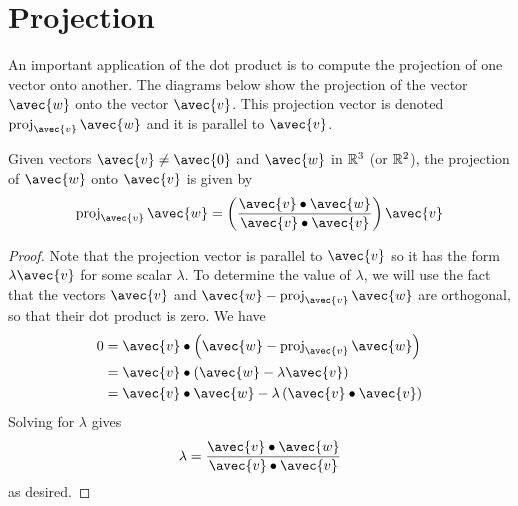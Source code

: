 \documentclass[handout]{ximera}
\begin{document}
\section{Projection}

An important application of the dot product is to compute the projection of one vector onto another.
The diagrams below show the projection of the vector $\avec{w}$ onto the vector $\avec{v}$. This projection vector is denoted $\proj_{\avec{v}} \avec{w}$
and it is parallel to $\avec{v}$.

\begin{image}
\end{image}

\begin{proposition}
Given vectors $\avec{v} \neq \avec{0}$ and $\avec{w}$ in $\mathbb R^3$ (or $\mathbb R^2$), the projection of $\avec{w}$ onto $\avec{v}$ is given by
\[
\proj_{\avec{v}} \avec{w} = \left(\frac{\avec{v} \dotp \avec{w}}{\avec{v} \dotp \avec{v}}\right) \avec{v}
\]


\begin{proof}
Note that the projection vector is parallel to $\avec{v}$ so it has the form $\lambda \avec{v}$ for some scalar $\lambda$.
To determine the value of $\lambda$, we will use the fact that the vectors $\avec{v}$ and $\avec{w} - \proj_{\avec{v}} \avec{w}$ are orthogonal, 
so that their dot product is zero. We have
\begin{align*}
0 &= \avec{v} \dotp \left(\avec{w} - \proj_{\avec{v}} \avec{w} \right)\\
  &= \avec{v} \dotp \left(\avec{w} - \lambda \avec{v}\right)\\
  &= \avec{v} \dotp \avec{w} - \lambda \left( \avec{v} \dotp \avec{v} \right)
\end{align*}
Solving for $\lambda$ gives
\[
\lambda = \frac{\avec{v} \dotp \avec{w}}{\avec{v} \dotp \avec{v}}
\]
as desired.
\end{proof}
\end{proposition}
\end{document}
